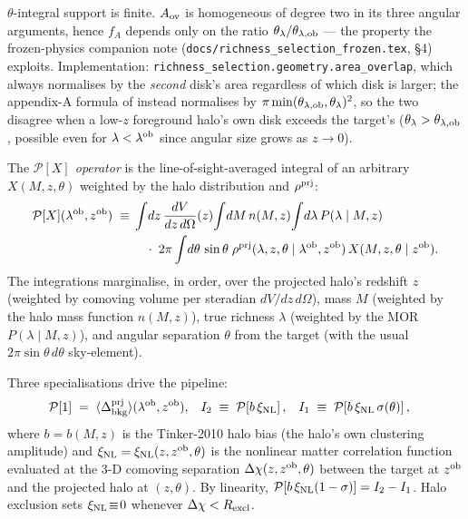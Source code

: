 \documentclass[a4paper, 11pt]{article}
\newcommand{\lob}{\lambda^{\rm ob}}
\newcommand{\zob}{z^{\rm ob}}
\newcommand{\dprj}{\Delta^{\rm prj}}
\newcommand{\xinl}{\xi_{\rm NL}}
\newcommand{\Pop}{\mathcal{P}}
\newcommand{\rhoprj}{\rho^{\rm prj}}
\newcommand{\avg}[1]{\langle #1 \rangle}
\begin{document}
\(\theta\)-integral support is finite. \(A_{\rm ov}\) is
homogeneous of degree two in its three angular arguments, hence
\(f_A\) depends only on the ratio
\(\theta_\lambda/\theta_{\lambda,{\rm ob}}\) --- the property the
frozen-physics companion note
(\texttt{docs/richness\_selection\_frozen.tex}, \S4) exploits.
Implementation:
\texttt{richness\_selection.geometry.area\_overlap}, which always
normalises by the \emph{second} disk's area regardless of which
disk is larger; the appendix-A formula of \citealt{Costanzi2026}
instead normalises by
\(\pi\min(\theta_{\lambda,{\rm ob}},\theta_\lambda)^2\), so the two
disagree when a low-\(z\) foreground halo's own disk exceeds the
target's (\(\theta_\lambda>\theta_{\lambda,{\rm ob}}\), possible
even for \(\lambda<\lob\) since angular size grows as \(z\to0\)).

The \emph{\(\Pop[X]\) operator} is the line-of-sight-averaged
integral of an arbitrary \(X(M,z,\theta)\) weighted by the halo
distribution and \(\rhoprj\):
\begin{align}
\Pop[X](\lob,\zob)
\;\equiv\;&
\int\!dz\,\frac{dV}{dz\,d\Omega}(z)\!
\int\!dM\,n(M,z)\!
\int\!d\lambda\,P(\lambda\mid M,z)
\notag\\
&\quad\cdot\;2\pi\int\!d\theta\,\sin\theta\;
\rhoprj(\lambda,z,\theta\mid\lob,\zob)\,X(M,z,\theta\mid\zob).
\label{eq:Pop}
\end{align}
The integrations marginalise, in order, over the projected halo's
redshift \(z\) (weighted by comoving volume per steradian
\(dV/dz\,d\Omega\)), mass \(M\) (weighted by the halo mass function
\(n(M,z)\)), true richness \(\lambda\) (weighted by the MOR
\(P(\lambda\mid M,z)\)), and angular separation \(\theta\) from the
target (with the usual \(2\pi\sin\theta\,d\theta\) sky-element).

Three specialisations drive the pipeline:
\begin{align}
\Pop[1]   &\;=\; \avg{\dprj_{\rm bkg}}(\lob,\zob),
&I_2 &\;\equiv\; \Pop\!\left[b\,\xinl\right],
&I_1 &\;\equiv\; \Pop\!\left[b\,\xinl\,\sigma(\theta)\right],
\end{align}
where \(b=b(M,z)\) is the Tinker-2010 halo bias (the halo's own
clustering amplitude) and
\(\xinl=\xinl(z,\zob,\theta)\) is the nonlinear matter correlation
function evaluated at the 3-D comoving separation
\(\Delta\chi(z,\zob,\theta)\) between the target at \(\zob\) and
the projected halo at \((z,\theta)\). By linearity,
\(\Pop[b\,\xinl(1-\sigma)] = I_2 - I_1\). Halo exclusion sets
\(\xinl\!\equiv\!0\) whenever \(\Delta\chi<R_{\rm excl}\).
\end{document}
